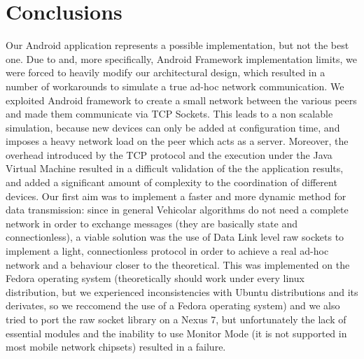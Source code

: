 \newpage
\section{Conclusions}
	Our Android application represents a possible implementation, but not the best one. Due to \direct and, more specifically, Android \direct Framework implementation limits, we were forced to heavily modify our architectural design, which resulted in a number of workarounds to simulate a true ad-hoc network communication. We exploited Android \direct framework to create a small network between the various peers and made them communicate via TCP Sockets. This leads to a non scalable simulation, because new devices can only be added at configuration time, and imposes a heavy network load on the peer which acts as a server.
	Moreover, the overhead introduced by the TCP protocol and the execution under the Java Virtual Machine resulted in a difficult validation of the the application results, and added a significant amount of complexity to the coordination of different devices.
	Our first aim was to implement a faster and more dynamic method for data transmission: since in general Vehicolar algorithms do not need a complete network in order to exchange messages (they are basically state and connectionless), a viable solution was the use of Data Link level raw sockets to implement a light, connectionless protocol in order to achieve a real ad-hoc network and a behaviour closer to the theoretical. This was implemented on the Fedora operating system (theoretically should work under every linux distribution, but we experienced inconsistencies with Ubuntu distributions and its derivates, so we reccomend the use of a Fedora operating system) and we also tried to port the raw socket library on a Nexus 7, but unfortunately the lack of essential modules and the inability to use Monitor Mode (it is not supported in most mobile network chipsets) resulted in a failure.

